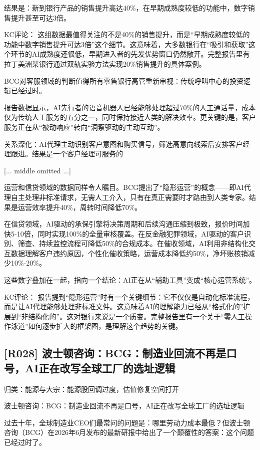 \documentclass[11pt]{ctexart}
\begin{document}
结果是：新到银行产品的销售提升高达40\%，在早期成熟度较低的功能中，数字销售提升甚至可达3倍。

KC评论： 这组数据最值得关注的不是40\%的销售提升，而是“早期成熟度较低的功能中数字销售提升可达3倍”这个细节。这意味着，大多数银行在“吸引和获取”这个环节的AI成熟度还很低，早期进入者的先发优势窗口仍然敞开。完整报告里有拉丁美洲某银行通过双轨实验方法实现20\%销售提升的具体案例。

BCG对客服领域的判断值得所有零售银行高管重新审视：传统呼叫中心的投资逻辑已经过时。

报告数据显示，AI先行者的语音机器人已经能够处理超过70\%的人工通话量，成本仅为传统人工服务的五分之一，同时保持接近人类的解决效率。更关键的是，客户服务正在从“被动响应”转向“洞察驱动的主动互动”。

关系深化：AI代理主动识别客户意图和购买信号，筛选高意向线索后安排客户经理跟进。结果是一个客户经理可服务的

[... middle omitted ...]

运营和信贷领域的数据同样令人瞩目。BCG提出了“隐形运营”的概念——即AI代理自主处理非标准请求，无需人工介入，只有在真正需要时才路由到人类专家。结果是运营效率提升40\%，周转时间降低70\%。

在信贷领域，AI驱动的承保引擎将决策周期和后续沟通压缩到极致，报价时间加快5-10倍，同时实现100\%的全量审核覆盖。在反金融犯罪领域，AI驱动的客户识别、筛查、持续监控流程可降低50\%的合规成本。在催收领域，AI利用非结构化交互数据理解客户违约原因，个性化催收策略，运营成本降低约50\%，净坏账核销减少10\%-20\%。

这些数字叠加在一起，指向一个结论：AI正在从“辅助工具”变成“核心运营系统”。

KC评论： 报告提到“隐形运营”时有一个关键细节：它不仅仅是自动化标准流程，而是让AI代理能够处理非标准文件。这意味着AI的理解能力已经从“格式化的”扩展到“非结构化的”。这对银行来说是一个质变。完整报告里有一个关于“零人工操作泳道”如何逐步扩大的框架图，是理解这个趋势的关键。

\subsection{[R028] 波士顿咨询：BCG：制造业回流不再是口号，AI正在改写全球工厂的选址逻辑}
{\small\color{refgray}归类：能源与大宗：能源股回调过度，估值修复空间打开}

波士顿咨询：BCG：制造业回流不再是口号，AI正在改写全球工厂的选址逻辑

过去十年，全球制造业CEO们最常问的问题是：哪里劳动力成本最低？但波士顿咨询（BCG）在2026年6月发布的最新研报中给出了一个颠覆性的答案：这个问题已经过时了。
\end{document}

